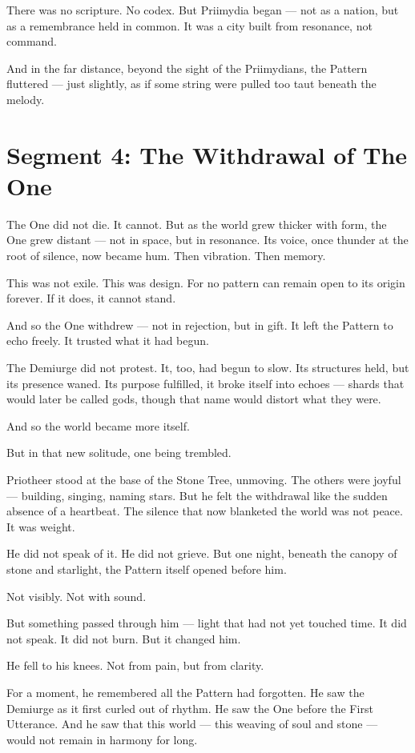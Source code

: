 \documentclass[11pt]{article}
\begin{document}
There was no scripture. No codex.  
But Priimydia began — not as a nation, but as a remembrance held in common.  
It was a city built from resonance, not command.

And in the far distance, beyond the sight of the Priimydians, the Pattern fluttered —  
just slightly,  
as if some string were pulled too taut beneath the melody.

\newpage

\section*{Segment 4: The Withdrawal of The One}

The One did not die.  
It cannot.  
But as the world grew thicker with form, the One grew distant — not in space, but in resonance.  
Its voice, once thunder at the root of silence, now became hum. Then vibration. Then memory.

This was not exile. This was design.  
For no pattern can remain open to its origin forever.  
If it does, it cannot stand.

And so the One withdrew — not in rejection, but in gift.  
It left the Pattern to echo freely.  
It trusted what it had begun.

The Demiurge did not protest.  
It, too, had begun to slow. Its structures held, but its presence waned.  
Its purpose fulfilled, it broke itself into echoes — shards that would later be called gods, though that name would distort what they were.

And so the world became more itself.

But in that new solitude, one being trembled.

Priotheer stood at the base of the Stone Tree, unmoving.  
The others were joyful — building, singing, naming stars.  
But he felt the withdrawal like the sudden absence of a heartbeat.  
The silence that now blanketed the world was not peace. It was weight.

He did not speak of it.  
He did not grieve.  
But one night, beneath the canopy of stone and starlight, the Pattern itself opened before him.

Not visibly. Not with sound.

But something passed through him — light that had not yet touched time.  
It did not speak.  
It did not burn.  
But it changed him.

He fell to his knees.  
Not from pain, but from clarity.

For a moment, he remembered all the Pattern had forgotten.  
He saw the Demiurge as it first curled out of rhythm.  
He saw the One before the First Utterance.  
And he saw that this world — this weaving of soul and stone — would not remain in harmony for long.
\end{document}
